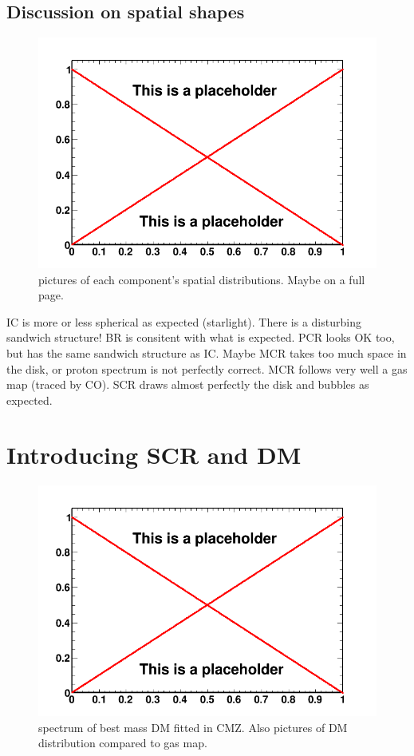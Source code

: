 \subsection{Discussion on spatial shapes}
\begin{figure}
  \centering
  \includegraphics[width=.9\linewidth]{pic/dummy.png}
  \caption{pictures of each component's spatial distributions. Maybe on a full page.}
  \label{fig:spatial_shapes}
\end{figure}
IC is more or less spherical as expected (starlight). There is a disturbing sandwich structure!
BR is consitent with what is expected.
PCR looks OK too, but has the same sandwich structure as IC. Maybe MCR takes too much space in the disk, or proton spectrum is not perfectly correct.
MCR follows very well a gas map (traced by CO).
SCR draws almost perfectly the disk and bubbles as expected.


\section{Introducing SCR and DM}

\begin{figure}
  \centering
  \includegraphics[width=.9\linewidth]{pic/dummy.png}
  \caption{spectrum of best mass DM fitted in CMZ. Also pictures of DM distribution compared to gas map.}
  \label{fig:DMonly_fit}
\end{figure}

